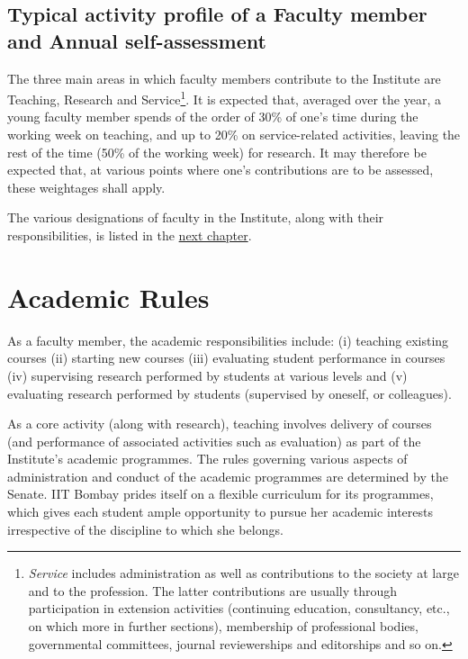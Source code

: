\documentclass[
  10pt,
  a5paper,
  10pt,
  openany]{amsbook}
\begin{document}
\section{Typical activity profile of a Faculty member and Annual
self-assessment}\label{typical-activity-profile-of-a-faculty-member-and-annual-self-assessment}

The three main areas in which faculty members contribute to the
Institute are Teaching, Research and Service\footnote{\emph{Service}
  includes administration as well as contributions to the society at
  large and to the profession. The latter contributions are usually
  through participation in extension activities (continuing education,
  consultancy, etc., on which more in further sections), membership of
  professional bodies, governmental committees, journal reviewerships
  and editorships and so on.}. It is expected that, averaged over the
year, a young faculty member spends of the order of 30\% of one's time
during the working week on teaching, and up to 20\% on service-related
activities, leaving the rest of the time (50\% of the working week) for
research. It may therefore be expected that, at various points where
one's contributions are to be assessed, these weightages shall apply.

The various designations of faculty in the Institute, along with their
responsibilities, is listed in the \hyperref[sec:facultygrades]{next
chapter}.

\chapter{Academic Rules}\label{sec:acadrules}

As a faculty member, the academic responsibilities include: (i) teaching
existing courses (ii) starting new courses (iii) evaluating student
performance in courses (iv) supervising research performed by students
at various levels and (v) evaluating research performed by students
(supervised by oneself, or colleagues).

As a core activity (along with research), teaching involves delivery of
courses (and performance of associated activities such as evaluation) as
part of the Institute's academic programmes. The rules governing various
aspects of administration and conduct of the academic programmes are
determined by the Senate. IIT Bombay prides itself on a flexible
curriculum for its programmes, which gives each student ample
opportunity to pursue her academic interests irrespective of the
discipline to which she belongs.
\end{document}
